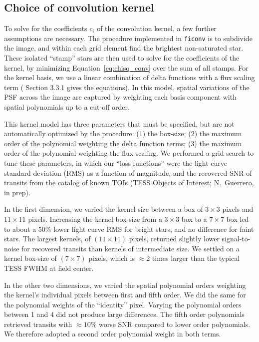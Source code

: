 \documentclass[12pt,twocolumn,tighten]{aastex62}
\begin{document}
\subsection{Choice of convolution kernel}

To solve for the coefficients $c_i$ of the convolution kernel, a few
further assumptions are necessary.  The procedure implemented in
\texttt{ficonv} is to subdivide the image, and within each grid
element find the brightest non-saturated star. These isolated
``stamp'' stars are then used to solve for the coefficients of the
kernel, by minimizing Equation~\ref{eq:chisq_conv} over the sum of all
stamps.  For the kernel basis, we use a linear combination of delta
functions with a flux scaling term
(\citealt{soares-furtado_image_2017} Section 3.3.1 gives the
equations).  In this model, spatial variations of the PSF across the
image are captured by weighting each basis component with spatial
polynomials up to a cut-off order.

This kernel model has three parameters that must be specified, but are
not automatically optimized by the procedure: (1) the box-size; (2)
the maximum order of the polynomial weighting the delta function
terms; (3) the maximum order of the polynomial weighting the flux
scaling.  We performed a grid-search to tune these parameters, in
which our ``loss functions'' were the light curve standard deviation
(RMS) as a function of magnitude, and the recovered SNR of transits
from the catalog of known TOIs (TESS Objects of Interest; N.~Guerrero,
in prep).

In the first dimension, we varied the kernel size between a box of
$3\times3$ pixels and $11\times11$ pixels.  Increasing the kernel
box-size from a $3\times3$ box to a $7\times7$ box led to about a 50\%
lower light curve RMS for bright stars, and no difference for faint
stars.  The largest kernels, of $(11\times11)$ pixels, returned
slightly lower signal-to-noise for recovered transits than kernels of
intermediate size.  We settled on a kernel box-size of $(7\times7)$
pixels, which is $\approx$2 times larger than the typical TESS FWHM at
field center. 

In the other two dimensions, we varied the spatial polynomial orders
weighting the kernel's individual pixels between first and fifth
order.  We did the same for the polynomial weights of the ``identity''
pixel.  Varying the polynomial orders between 1 and 4 did not produce
large differences.  The fifth order polynomials retrieved transits
with $\approx10\%$ worse SNR compared to lower order polynomials.  We
therefore adopted a second order polynomial weight in both terms.
\end{document}
